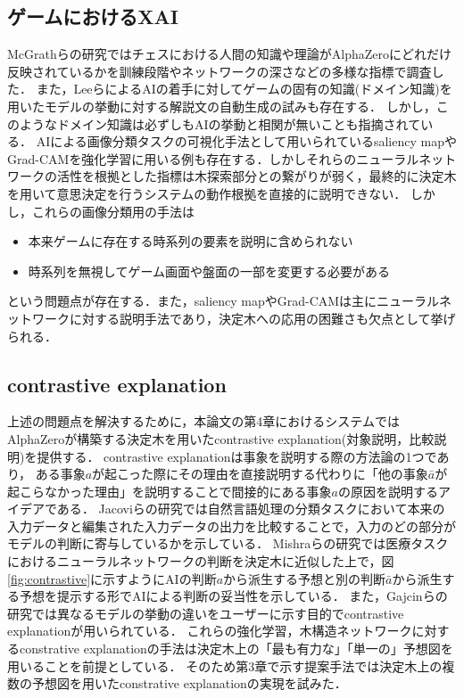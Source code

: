 \subsection{ゲームにおけるXAI}
McGrathらの研究\cite{DeepMind}ではチェスにおける人間の知識や理論がAlphaZeroにどれだけ反映されているかを訓練段階やネットワークの深さなどの多様な指標で調査した．
また，Leeら\cite{ChessComments}によるAIの着手に対してゲームの固有の知識(ドメイン知識)を用いたモデルの挙動に対する解説文の自動生成の試みも存在する．
しかし，このようなドメイン知識は必ずしもAIの挙動と相関が無いことも指摘されている\cite{DeepMind}．
AIによる画像分類タスクの可視化手法として用いられているsaliency map\cite{saliency}やGrad-CAM\cite{Grad-CAM}を強化学習に用いる例も存在する\cite{gl}\cite{atari-saliency}\cite{visualize}．しかしそれらのニューラルネットワークの活性を根拠とした指標は木探索部分との繋がりが弱く，最終的に決定木を用いて意思決定を行うシステムの動作根拠を直接的に説明できない．
しかし，これらの画像分類用の手法は
\begin{itemize}
	\item 本来ゲームに存在する時系列の要素を説明に含められない
	\item 時系列を無視してゲーム画面や盤面の一部を変更する必要がある
\end{itemize}
という問題点が存在する．また，saliency mapやGrad-CAMは主にニューラルネットワークに対する説明手法であり，決定木への応用の困難さも欠点として挙げられる．

\subsection{contrastive explanation}
上述の問題点を解決するために，本論文の第4章におけるシステムではAlphaZeroが構築する決定木を用いたcontrastive explanation(対象説明，比較説明)を提供する．
contrastive explanationは事象を説明する際の方法論の1つであり，
ある事象$a$が起こった際にその理由を直接説明する代わりに「他の事象$\bar{a}$が起こらなかった理由」を説明することで間接的にある事象$a$の原因を説明するアイデアである\cite{contrastive}．
Jacoviらの研究\cite{contrastive}では自然言語処理の分類タスクにおいて本来の入力データと編集された入力データの出力を比較することで，入力のどの部分がモデルの判断に寄与しているかを示している．
Mishraらの研究\cite{whyNot}では医療タスクにおけるニューラルネットワークの判断を決定木に近似した上で，図\ref{fig:contrastive}に示すようにAIの判断$a$から派生する予想と別の判断$\bar{a}$から派生する予想を提示する形でAIによる判断の妥当性を示している．
また，Gajcinらの研究\cite{preference}では異なるモデルの挙動の違いをユーザーに示す目的でcontrastive explanationが用いられている．
これらの強化学習，木構造ネットワークに対するconstrative explanationの手法は決定木上の「最も有力な」「単一の」予想図を用いることを前提としている．
そのため第3章で示す提案手法では決定木上の複数の予想図を用いたconstrative explanationの実現を試みた．

